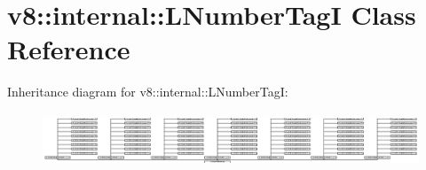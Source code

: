 \hypertarget{classv8_1_1internal_1_1_l_number_tag_i}{}\section{v8\+:\+:internal\+:\+:L\+Number\+TagI Class Reference}
\label{classv8_1_1internal_1_1_l_number_tag_i}
Inheritance diagram for v8\+:\+:internal\+:\+:L\+Number\+TagI\+:\begin{figure}[H]
\begin{center}
\leavevmode
\includegraphics[height=1.635688cm]{classv8_1_1internal_1_1_l_number_tag_i}
\end{center}
\end{figure}
